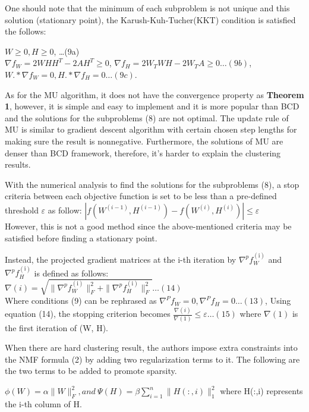 \documentclass[11pt, oneside]{article}   	%
\begin{document}
One should note that the minimum of each subproblem is not unique and this solution (stationary point), the Karush-Kuh-Tucher(KKT) condition is satisfied the follows:
\begin{flushleft}
$W\geq0, H\geq0$, \ldots (9a)\\
$\nabla f_W=2WHH^{T}-2AH^{T}\geq0$, $\nabla f_H=2W_{T}WH-2W_{T}A\geq0 \ldots (9b)$,
$W.\ast\nabla f_W= 0, H.\ast\nabla f_H= 0 \ldots (9c)$.\\
\end{flushleft}

As for the MU algorithm, it does not have the convergence property as \textbf{Theorem 1}, however, it is simple and easy to implement and it is more popular than BCD and the solutions for the subproblems (8) are not optimal.  The update rule of MU is similar to gradient descent algorithm with certain chosen step lengths for making sure the result is nonnegative.  Furthermore, the solutions of MU are denser than BCD framework, therefore, it's harder to explain the clustering results.

With the numerical analysis to find the solutions for the subproblems (8), a stop criteria between each objective function is set to be less than a pre-defined threshold $\varepsilon$ as follow:
$| f(W^{(i-1)},H^{(i-1)}) -f(W^{(i)},H^{(i)}) |\leq \varepsilon$\\

However, this is not a good method since the above-mentioned criteria may be satisfied before finding a stationary point.

Instead, the projected gradient matrices at the i-th iteration by $\nabla^{p} f^{\mathrm{(i)}}_{W} $ and $\nabla^{p} f^{\mathrm{(i)}}_{H} $ is defined as follows:\\
$\nabla(i)=\sqrt{\|\nabla^{p} f^{\mathrm{(i)}}_{W} \|^{\mathrm{2}}_{F} +\|\nabla^{p} f^{\mathrm{(i)}}_{H} \|^{\mathrm{2}}_{F} }\ldots (14)$\\
Where conditions (9) can be rephrased as $\nabla^{P} f_W= 0, \nabla^{P} f_H= 0\ldots(13)$,
Using equation (14), the stopping criterion becomes $\frac{\nabla(i)}{\nabla(1)}\leq\varepsilon \ldots (15)$
where $\nabla(1)$ is the first iteration of (W, H).

When there are hard clustering result, the authors impose extra constraints into the NMF formula (2) by adding two regularization terms to it.  The following are the two terms to be added to promote sparsity.

 $\phi(W)=\alpha\|W\|^{\mathrm{2}}_{F}, and\ \Psi(H)=\beta\sum_{i=1}^n\|H(:,i)\|^{\mathrm{2}}_{1}$
 where H(:,i) represents the i-th column of H.
 
\end{document}
